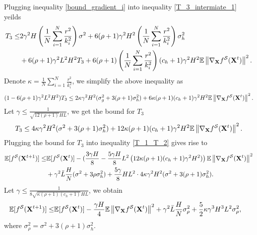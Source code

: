 \documentclass{article} %
\theoremstyle{plain}
\theoremstyle{definition}
\begin{document}
Plugging inequality \eqref{bound_gradient_i} into inequality \eqref{T_3_intermiate_1} yeilds
    \begin{align}
    T_3 \leq & 2 \gamma^2 H \left( \frac{1}{N} \sum_{i=1}^{N} \frac{r^2}{k_i^2} \right) \sigma^2 + 6 (\rho+1) \gamma^2 H^2 \left( \frac{1}{N} \sum_{i=1}^{N} \frac{r^2}{k_i^2} \right) \sigma^2_h  \nonumber \\
    & + 6 (\rho+1) \gamma^2 L^2 H^2 T_3 + 6(\rho+1) \left( \frac{1}{N} \sum_{i=1}^{N} \frac{r^2}{k_i^2} \right) (c_h + 1)\gamma^2 H^2\mathbb{E} \left \| \nabla_{\bf X} f^{\mathcal{S}} ({\bf X}^t)
    \right \|^2.
\end{align}
Denote $\kappa = \frac{1}{N} \sum_{i=1}^{N} \frac{r^2}{k_i^2}$, we simplify the above inequality as 
\begin{align}
    (1- 6(\rho +1) \gamma^2 L^2 H^2) T_3 \leq 2 \kappa \gamma^2 H^2 (\sigma_g^2 + 3(\rho+1) \sigma_h^2) + 6\kappa (\rho+1)(c_h +1) \gamma^2 H^2 \mathbb{E} \left \| \nabla_{\bf X} f^{\mathcal{S}} ({\bf X}^t)  
    \right \|^2. \nonumber
\end{align}
Let $\gamma \leq \frac{1}{\sqrt{12(\rho+1)}HL}$, we get the bound for $T_3$
\begin{align} \label{T_3}
    T_3 \leq 4 \kappa \gamma^2 H^2 (\sigma^2 + 3(\rho+1) \sigma_h^2) + 12 \kappa (\rho+1) (c_h +1) \gamma^2 H^2 \mathbb{E} \left \| \nabla_{\bf X} f^{\mathcal{S}} ({\bf X}^t)
    \right \|^2.
\end{align}
Plugging the bound for $T_3$ into inequality \eqref{T_1_T_2} gives rise to
\begin{align}
   \mathbb{E} [f^{\mathcal{S}}({\bf X}^{t+1})] \leq & \mathbb{E}[f^{\mathcal{S}}({\bf X}^t)]   - ( \frac{3\gamma H}{8} - \frac{5\gamma H}{8} L^2 \left(12 \kappa (\rho+1) (c_h +1) \gamma^2 H^2) \right) \mathbb{E} \left\| \nabla_{\bf X} f^{\mathcal{S}} ({\bf X}^t) \right\|^2 \nonumber \\
   &+ \gamma^2 \bar{L} \frac{H}{N} (\sigma^2 + 3\rho \sigma_h^2) + \frac{5\gamma}{8} H L^2 \cdot 4 \kappa \gamma^2 H^2 (\sigma^2 + 3(\rho+1) \sigma_h^2).
\end{align}
Let $\gamma \leq \frac{1}{8\sqrt{\kappa (\rho+1) (c_h +1)} HL}$, we obtain
\begin{align}
   \mathbb{E} [f^{\mathcal{S}}({\bf X}^{t+1})] \leq & \mathbb{E}[f^{\mathcal{S}}({\bf X}^t)]   - \frac{\gamma H}{4} \mathbb{E} \left\| \nabla_{\bf X} f^{\mathcal{S}} ({\bf X}^t) \right\|^2 + \gamma^2 \bar{L} \frac{H}{N} \sigma_{\rho}^2 + \frac{5}{2} \kappa \gamma^3 H^3 L^2 \sigma_{\rho}^2,
\end{align}
where $ \sigma_{\rho}^2 = \sigma^2 + 3(\rho+1) \sigma_h^2$.
\end{document}
